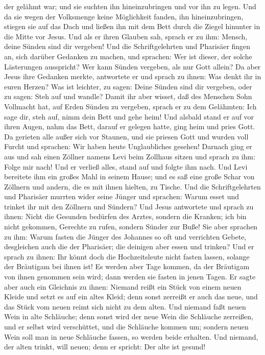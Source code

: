 der gelähmt war; und sie suchten ihn hineinzubringen und vor ihn zu
legen.  Und da sie wegen der Volksmenge keine Möglichkeit
fanden, ihn hineinzubringen, stiegen sie auf das Dach und ließen ihn mit
dem Bett durch die Ziegel hinunter in die Mitte vor Jesus.
 Und als er ihren Glauben sah, sprach er zu ihm: Mensch,
deine Sünden sind dir vergeben!  Und die Schriftgelehrten
und Pharisäer fingen an, sich darüber Gedanken zu machen, und sprachen:
Wer ist dieser, der solche Lästerungen ausspricht? Wer kann Sünden
vergeben, als nur Gott allein?  Da aber Jesus ihre
Gedanken merkte, antwortete er und sprach zu ihnen: Was denkt ihr in
euren Herzen?  Was ist leichter, zu sagen: Deine Sünden
sind dir vergeben, oder zu sagen: Steh auf und wandle? 
Damit ihr aber wisset, daß des Menschen Sohn Vollmacht hat, auf Erden
Sünden zu vergeben, sprach er zu dem Gelähmten: Ich sage dir, steh auf,
nimm dein Bett und gehe heim!  Und alsbald stand er auf
vor ihren Augen, nahm das Bett, darauf er gelegen hatte, ging heim und
pries Gott.  Da gerieten alle außer sich vor Staunen, und
sie priesen Gott und wurden voll Furcht und sprachen: Wir haben heute
Unglaubliches gesehen!  Darnach ging er aus und sah einen
Zöllner namens Levi beim Zollhaus sitzen und sprach zu ihm: Folge mir
nach!  Und er verließ alles, stand auf und folgte ihm
nach.  Und Levi bereitete ihm ein großes Mahl in seinem
Hause; und es saß eine große Schar von Zöllnern und andern, die es mit
ihnen hielten, zu Tische.  Und die Schriftgelehrten und
Pharisäer murrten wider seine Jünger und sprachen: Warum esset und
trinket ihr mit den Zöllnern und Sündern?  Und Jesus
antwortete und sprach zu ihnen: Nicht die Gesunden bedürfen des Arztes,
sondern die Kranken;  ich bin nicht gekommen, Gerechte zu
rufen, sondern Sünder zur Buße!  Sie aber sprachen zu
ihm: Warum fasten die Jünger des Johannes so oft und verrichten Gebete,
desgleichen auch die der Pharisäer; die deinigen aber essen und trinken?
 Und er sprach zu ihnen: Ihr könnt doch die
Hochzeitsleute nicht fasten lassen, solange der Bräutigam bei ihnen ist!
 Es werden aber Tage kommen, da der Bräutigam von ihnen
genommen sein wird; dann werden sie fasten in jenen Tagen.
 Er sagte aber auch ein Gleichnis zu ihnen: Niemand reißt
ein Stück von einem neuen Kleide und setzt es auf ein altes Kleid; denn
sonst zerreißt er auch das neue, und das Stück vom neuen reimt sich
nicht zu dem alten.  Und niemand faßt neuen Wein in alte
Schläuche; denn sonst wird der neue Wein die Schläuche zerreißen, und er
selbst wird verschüttet, und die Schläuche kommen um; 
sondern neuen Wein soll man in neue Schläuche fassen, so werden beide
erhalten.  Und niemand, der alten trinkt, will neuen;
denn er spricht: Der alte ist gesund!


